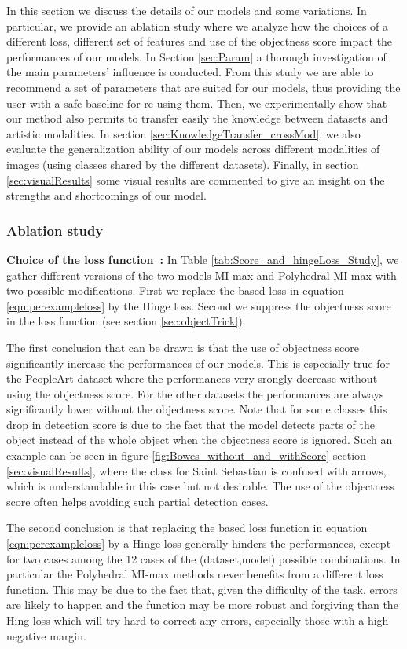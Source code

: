 \documentclass[preprint]{elsarticle}
\newcommand\MILS{MI-max}
\newcommand\MaxOfMaxS{Polyhedral MI-max}
\begin{document}
 In this section we discuss the details of our models and some variations. In particular, we provide an ablation study where we analyze how the choices of a different loss, different set of features and use of  the objectness  score impact the performances of our models. In Section \ref{sec:Param} a thorough investigation of the main parameters' influence is conducted. From this study we are able to recommend a set of parameters that are suited for our models, thus providing the user with a safe baseline for re-using them. Then, we experimentally show that our method also permits to transfer easily the knowledge between datasets and artistic modalities. In section \ref{sec:KnowledgeTransfer_crossMod}, we also evaluate the generalization ability of our models across different modalities of images (using classes shared by the different datasets).  Finally, in section \ref{sec:visualResults} some visual results are commented to give an insight on the strengths and shortcomings of our model. 


\subsubsection{Ablation study}
\label{sec:ablationStudy}
 {\bf Choice of the loss function~:}
In Table \ref{tab:Score_and_hingeLoss_Study}, we gather different versions of the two models \MILS{} and \MaxOfMaxS{} with two possible modifications. First we replace the  based loss in equation \eqref{eqn:perexampleloss} by the Hinge loss. Second we suppress the objectness score in the loss function (see section \ref{sec:objectTrick}).

The first conclusion that can be drawn is that the use of objectness score significantly increase the performances of our models. This is especially true for the PeopleArt dataset where the performances very srongly decrease without using the objectness score. For the other datasets the performances are always significantly lower without the objectness score. Note that for some classes this drop in detection score is due to the fact that the model detects parts of the object instead of the whole object when the objectness score is ignored. Such an example can be seen in figure \ref{fig:Bowes_without_and_withScore} section \ref{sec:visualResults}, where the class for Saint Sebastian is confused with arrows, which is understandable in this case but not desirable. The use of the objectness score often helps avoiding such partial detection cases. 

The second conclusion is that replacing the  based loss function in equation \eqref{eqn:perexampleloss} by a Hinge loss  generally hinders the performances, except for two cases among the 12 cases of the (dataset,model) possible combinations. In particular the \MaxOfMaxS{} methods never benefits from a different loss function. This may be due to the fact that, given the difficulty of the task, errors are likely to happen and the  function may be more robust and forgiving than the Hing loss which will try hard to correct any errors, especially those with a high negative margin.  
 
\end{document}
